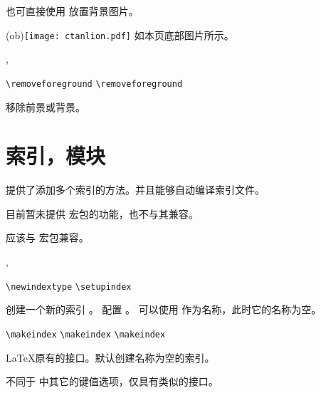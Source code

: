 \documentclass{whudoc}
\begin{document}
也可直接使用  放置背景图片。
\begin{xample}
\background(ob){\texttt{[image: ctanlion.pdf]}}
\stopxamplecode
\xampleprint
如本页底部图片所示。
\end{xample}


\begin{function}{\removeforeground,\removebackground}
  \begin{syntax}
    \verb|\removeforeground|
    \verb|\removeforeground| 
  \end{syntax}
移除前景或背景。
\end{function}


\section{索引，模块}

\WhuTeX 提供了添加多个索引的方法。并且能够自动编译索引文件。

目前暂未提供  宏包的功能，也不与其兼容。

应该与  宏包兼容。

\begin{function}{\newindextype,\setupindex}
  \begin{syntax}
    \verb|\newindextype|  
    \verb|\setupindex|    
  \end{syntax}
 创建一个新的索引 。
 配置 。
 可以使用  作为名称，此时它的名称为空。
\end{function}

\begin{function}{\makeindex}
  \begin{syntax}
    \verb|\makeindex|
    \verb|\makeindex| 
    \verb|\makeindex|  
  \end{syntax}
\LaTeX 原有的接口。默认创建名称为空的索引。
\end{function}

 不同于 \WhuTeX 中其它的键值选项，仅具有类似的接口。
\end{document}
